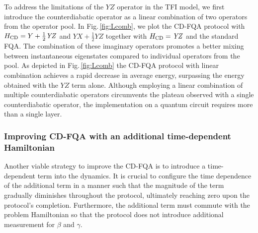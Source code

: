 \documentclass[twocolumn,aps,superscriptaddress,floatfix,longbibliography]{revtex4-2}
\newcommand{\hir}[1]{{\color[rgb]{0.4,0.1,0.6}{#1}}}
\newcommand{\Fig}[1]{Fig.\,\ref{fig:#1}}
\def\YX{\ensuremath{\mathit{YX}}\xspace} %
\def\YZ{\ensuremath{\mathit{YZ}}\xspace}
\begin{document}
To address the limitations of the \YZ operator in the TFI model,
we first introduce the counterdiabatic operator as a linear
combination of two operators from the operator pool. In
\Fig{Lcomb}, we plot the CD-FQA protocol with $H_{\rm CD}=Y+
\frac{1}{2} %
\YZ$ and $\YX + \frac{1}{2} %
\YZ$ together with $H_{\rm CD}=\YZ$ and
the standard FQA.  The combination of these imaginary operators
promotes a better mixing between instantaneous eigenstates
compared to individual operators from the pool. As depicted in
\Fig{Lcomb} the CD-FQA protocol with linear combination achieves
a rapid decrease in average energy, surpassing the energy
obtained with the \YZ term alone. Although employing a linear
combination of multiple counterdiabatic operators circumvents
the plateau observed with a single counterdiabatic operator, the
implementation on a quantum circuit requires more than a single
layer. 


\subsubsection{Improving CD-FQA with an additional time-dependent Hamiltonian}

Another viable strategy to improve the CD-FQA is to introduce a time-dependent term
into the dynamics. It is crucial to configure the time
dependence of the additional term in a manner such that the magnitude 
of the term gradually diminishes throughout the protocol,
ultimately reaching zero upon the protocol's completion.
Furthermore, the additional term must commute
with the problem Hamiltonian so that the protocol does not
introduce additional measurement for $\beta$ and $\gamma$.
\end{document}
